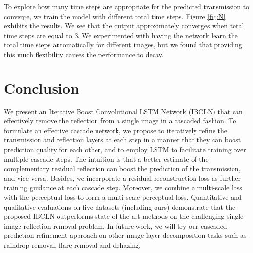 \documentclass[10pt,twocolumn,letterpaper]{article}
\begin{document}
To explore how many time steps are appropriate for the predicted transmission to converge, we train the model with different total time steps. Figure \ref{fig:N} exhibits the results. We see that the output approximately converges when total time steps are equal to 3. We experimented with having the network learn the total time steps automatically for different images, but we found that providing this much flexibility causes the performance to decay.
\begin{table}[!t]
    \centering
    \caption{Ablation study of IBCLN for loss terms on three testing sets. Each loss contributes to IBCLN's performance, and combining all achieves the best result.}
    \footnotesize
    \vspace{2pt}
    \vspace{-1.5em}    
    \label{tb:loss}
\end{table}

\section{Conclusion}
We present an Iterative Boost Convolutional LSTM Network (IBCLN) that can effectively remove the reflection from a single image in a cascaded fashion. To formulate an effective cascade network, 
we propose to iteratively refine the transmission and reflection layers at each step in a manner that they can boost prediction quality for each other, and to employ LSTM to facilitate training over multiple cascade steps. The intuition is that a better estimate of the complementary residual reflection can boost the prediction of the transmission, and vice versa. Besides, we incorporate a residual reconstruction loss as further training guidance at each cascade step.  
Moreover, we combine a multi-scale loss with the perceptual loss to form a multi-scale perceptual loss. Quantitative and qualitative evaluations on five datasets (including ours) demonstrate that the proposed IBCLN outperforms state-of-the-art methods on the challenging single image reflection removal problem. 
In future work, we will try our cascaded prediction refinement approach on other image layer decomposition tasks such as raindrop removal, flare removal and dehazing.
\end{document}
